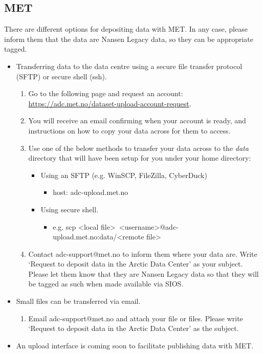 \documentclass[a4paper,english, 11pt]{article}
\begin{document}
\subsection{MET}
\label{ss:MET}

There are different options for depositing data with MET. In any case, please inform them that the data are Nansen Legacy data, so they can be appropriate tagged.

\begin{itemize}
\item Transferring data to the data centre using a secure file transfer protocol (SFTP) or secure shell (ssh).

\begin{enumerate}
\item Go to the following page and request an account:\\ \url{https://adc.met.no/dataset-upload-account-request}.
\item You will receive an email confirming when your account is ready, and instructions on how to copy your data across for them to access.
\item Use one of the below methods to transfer your data across to the \textit{data} directory that will have been setup for you under your home directory:
\begin{itemize}
\item Using an SFTP (e.g. WinSCP, FileZilla, CyberDuck)
\begin{itemize}
\item host: adc-upload.met.no
\end{itemize}
\item Using secure shell.
\begin{itemize}
\item e.g. scp \textless local file\textgreater \ \textless username\textgreater @adc-upload.met.no:data/\textless remote file\textgreater
\end{itemize}
\end{itemize}
\item Contact adc-support@met.no to inform them where your data are. Write `Request to deposit data in the Arctic Data Center' as your subject. Please let them know that they are Nansen Legacy data so that they will be tagged as such when made available via SIOS.
\end{enumerate}

\item Small files can be transferred via email.
\begin{enumerate}
\item Email adc-support@met.no and attach your file or files. Please write `Request to deposit data in the Arctic Data Center' as the subject.
\end{enumerate}

\item An upload interface is coming soon to facilitate publishing data with MET.

\end{itemize}
\end{document}
